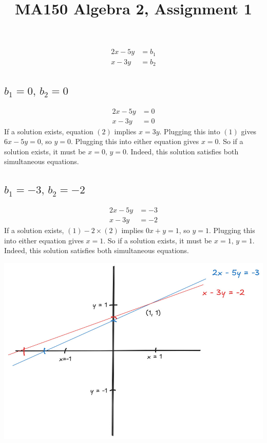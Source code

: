 \documentclass[a4paper]{article}
\title{MA150 Algebra 2, Assignment 1}
\begin{document}
\maketitle

\setlength{\parindent}{0em}
\setlength{\parskip}{1em}


\begin{align*}
2x - 5y &= b_1\\
x - 3y &= b_2
\end{align*}

\subsection{$b_1 = 0,\, b_2 = 0$}

\begin{align*}
2x - 5y &= 0 \tag{1}\\
x - 3y &= 0 \tag{2}
\end{align*}
If a solution exists, equation $(2)$ implies $x = 3y$. Plugging this into $(1)$ gives $6x - 5y = 0$, so $y=0$. Plugging this into either equation gives $x=0$.
So if a solution exists, it must be $x=0,\, y=0$. Indeed, this solution satisfies both simultaneous equations.

\subsection{$b_1 = -3,\, b_2 = -2$}

\begin{align*}
2x - 5y &= -3 \tag{1}\\
x - 3y &= -2 \tag{2}
\end{align*}
If a solution exists, $(1) - 2 \times (2)$ implies $0x + y = 1$, so $y=1$. Plugging this into either equation gives $x=1$.
So if a solution exists, it must be $x=1,\, y=1$. Indeed, this solution satisfies both simultaneous equations.

\begin{center}\includegraphics[scale=0.35]{Q1b}\end{center}
\end{document}
